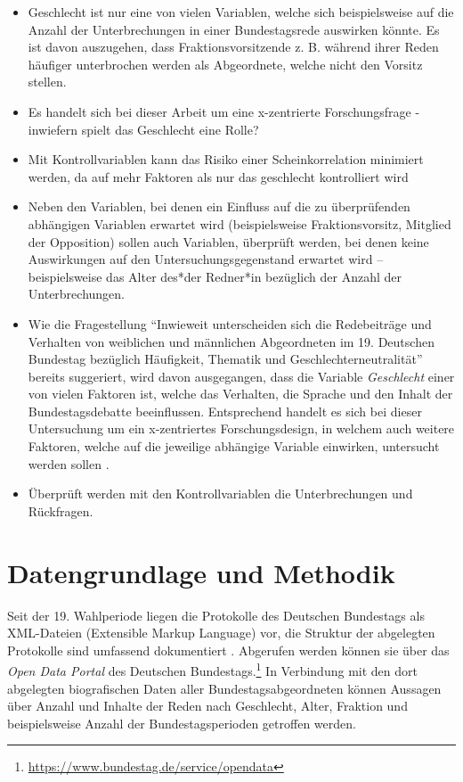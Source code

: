 \documentclass[12pt, 
    twoside=false, 
    bibliography=totoc, 
    numbers=endperiod, 
    headings=normal, 
    toc=chapterentrydotfill
    ]{scrbook}
\begin{document}
\begin{itemize}
    \item Geschlecht ist nur eine von vielen Variablen, welche sich beispielsweise auf die Anzahl der Unterbrechungen in einer Bundestagsrede auswirken könnte. Es ist davon auszugehen, dass Fraktionsvorsitzende z. B. während ihrer Reden häufiger unterbrochen werden als Abgeordnete, welche nicht den Vorsitz stellen.
    \item Es handelt sich bei dieser Arbeit um eine x-zentrierte Forschungsfrage \parencite[vgl.][4f.]{ganghof_2005}- inwiefern spielt das Geschlecht eine Rolle?
    \item Mit Kontrollvariablen kann das Risiko einer Scheinkorrelation minimiert werden, da auf mehr Faktoren als nur das geschlecht kontrolliert wird
    \item Neben den Variablen, bei denen ein Einfluss auf die zu überprüfenden abhängigen Variablen erwartet wird (beispielsweise Fraktionsvorsitz, Mitglied der Opposition) sollen auch Variablen, überprüft werden, bei denen keine Auswirkungen auf den Untersuchungsgegenstand erwartet wird -- beispielsweise das Alter des*der Redner*in bezüglich der Anzahl der Unterbrechungen.
    \item Wie die Fragestellung \enquote{Inwieweit unterscheiden sich die Redebeiträge und Verhalten von weiblichen und männlichen Abgeordneten im 19. Deutschen Bundestag bezüglich Häufigkeit, Thematik und Geschlechterneutralität} bereits suggeriert, wird davon ausgegangen, dass die Variable \emph{Geschlecht} einer von vielen Faktoren ist, welche das Verhalten, die Sprache und den Inhalt der Bundestagsdebatte beeinflussen. Entsprechend handelt es sich bei dieser Untersuchung um ein x-zentriertes Forschungsdesign, in welchem auch weitere Faktoren, welche auf die jeweilige abhängige Variable einwirken, untersucht werden sollen  \parencites[vgl.][3f.]{ganghof_2005}.
    \item Überprüft werden mit den Kontrollvariablen die Unterbrechungen und Rückfragen. 
\end{itemize}

\chapter{Datengrundlage und Methodik}

Seit der 19. Wahlperiode liegen die Protokolle des Deutschen Bundestags als XML-Dateien (Extensible Markup Language) vor, die Struktur der abgelegten Protokolle sind umfassend dokumentiert \parencite{bundestag_2015}. Abgerufen werden können sie über das \emph{Open Data Portal} des Deutschen Bundestags.\footnote{\url{https://www.bundestag.de/service/opendata}} In Verbindung mit den dort abgelegten biografischen Daten aller Bundestagsabgeordneten können Aussagen über Anzahl und Inhalte der Reden nach Geschlecht, Alter, Fraktion und beispielsweise Anzahl der Bundestagsperioden getroffen werden.
\end{document}
